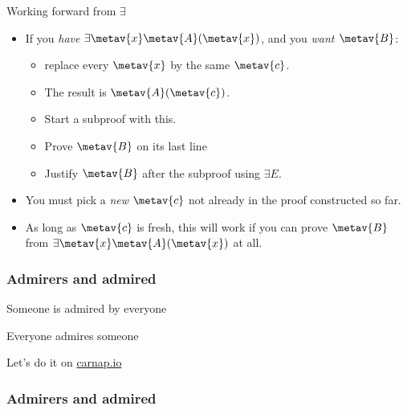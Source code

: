   \begin{frame}{Working forward from $\exists$}

  \begin{itemize}[<+->]
    \item If you \emph{have $\exists \metav{x}\metav{A}(\metav{x})$}, and you \emph{want  $\metav{B}$}:
      \begin{itemize}
        \item replace every $\metav{x}$ by the
        same $\metav{c}$.
        \item The result is $\metav{A}(\metav{c})$.
        \item Start a subproof with this.
        \item Prove $\metav{B}$ on its last line
        \item Justify $\metav{B}$ after the subproof using $\exists E$.
        \end{itemize}
    \item You must pick a \emph{new} $\metav{c}$ not already in the
    proof constructed so far.
    \item As long as $\metav{c}$ is fresh, this will work if you can
    prove $\metav{B}$ from $\exists \metav{x}\metav{A}(\metav{x})$ at all.
    \end{itemize}
\end{frame}

\begin{frame}
    \frametitle{Admirers and admired}

\begin{earg}
\item[] Someone is admired by everyone
\item[\therefore] Everyone admires someone
\end{earg}

\bigskip
\begin{fitchproof}
\end{fitchproof}
Let's do it on \href{https://carnap.io/shared/rzach@ucalgary.ca/Practice\%20Problems\%20VII.md}{carnap.io}
\end{frame}

\begin{frame}
  \frametitle{Admirers and admired}

  \begin{fitchproof}
    \open
    \close
  \end{fitchproof}
\end{frame}

